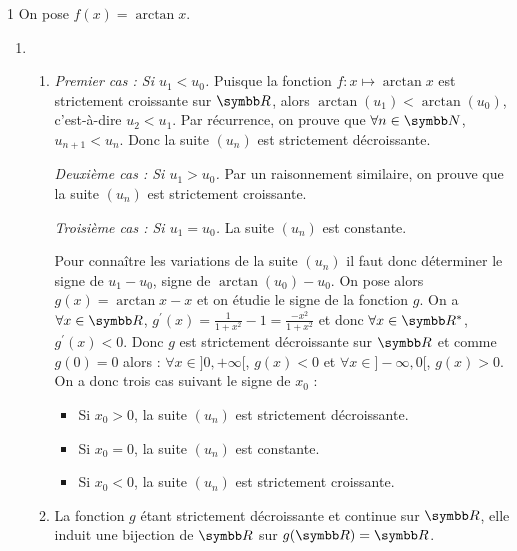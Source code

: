 \begin{correction}{1}
On pose $f(x)=\arctan x$.

\begin{enumerate}
\item~
    \begin{enumerate}
        \item
        \textit{Premier cas : Si $u_{1}<u_{0}$.}
        Puisque la fonction $f:x\mapsto \arctan x$ est strictement croissante sur $\R$, alors $\arctan(u_{1})<\arctan(u_{0})$, c'est-à-dire $u_{2}<u_{1}$.
        Par récurrence, on prouve que $\forall n\in\N$, $u_{n+1}<u_{n}$. Donc la suite $(u_{n})$ est strictement décroissante.

        \textit{Deuxième cas : Si $u_{1}>u_{0}$.}
        Par un raisonnement similaire, on prouve que la suite $(u_{n})$ est strictement croissante.

        \textit{Troisième cas : Si $u_{1}=u_{0}$.}
        La suite $(u_{n})$ est constante.

        Pour connaître les variations de la suite $(u_{n})$ il faut donc déterminer le signe de $u_{1}-u_{0}$, signe de $\arctan(u_{0})-u_{0}$.
        On pose alors $g(x)=\arctan x - x$ et on étudie le signe de la fonction $g$.
        On a $\forall x\in\R$, $g^{\prime}(x)=\frac{1}{1+x^{2}} - 1 = \frac{-x^{2}}{1+x^{2}}$ et donc $\forall x\in\R^{*}$, $g^{\prime}(x)<0$.
        Donc $g$ est strictement décroissante sur $\R$ et comme $g(0)=0$ alors :
        $\forall x\in]0,+\infty[$, $g(x)<0$ et $\forall x\in]-\infty,0[$, $g(x)>0$.
        On a donc trois cas suivant le signe de $x_{0}$ :
        \begin{itemize}
            \item Si $x_{0}>0$, la suite $(u_{n})$ est strictement décroissante.
            \item Si $x_{0}=0$, la suite $(u_{n})$ est constante.
            \item Si $x_{0}<0$, la suite $(u_{n})$ est strictement croissante.
        \end{itemize}

        \item 
        La fonction $g$ étant strictement décroissante et continue sur $\R$, elle induit une bijection de $\R$ sur $g(\R)=\R$.
        

\end{enumerate}
\end{enumerate}
\end{correction}
